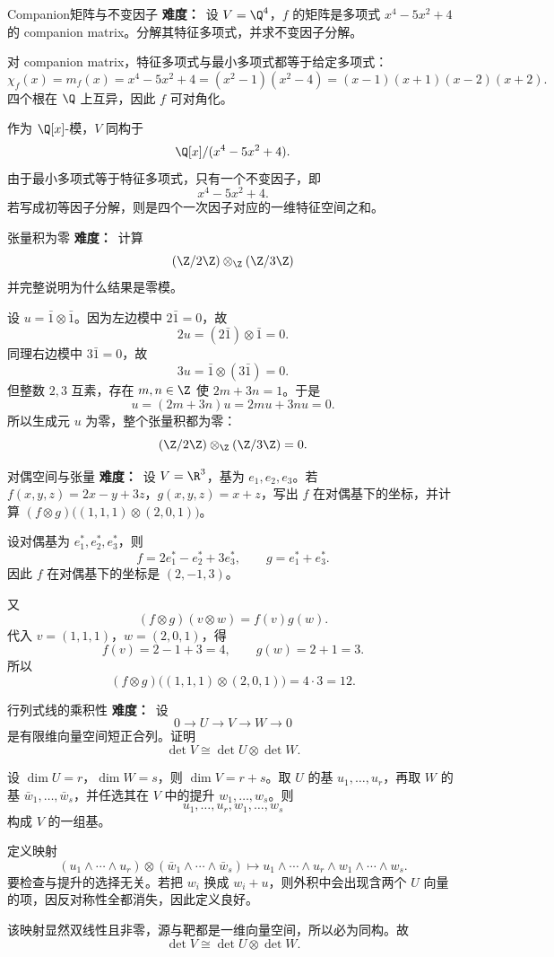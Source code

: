 \begin{problem}{Companion矩阵与不变因子}
\textbf{难度：}\medium\ 设 $V=\Q^4$，$f$ 的矩阵是多项式 $x^4-5x^2+4$ 的 companion matrix。分解其特征多项式，并求不变因子分解。
\end{problem}
\begin{solution}
对 companion matrix，特征多项式与最小多项式都等于给定多项式：
\[
\chi_f(x)=m_f(x)=x^4-5x^2+4=(x^2-1)(x^2-4)=(x-1)(x+1)(x-2)(x+2).
\]
四个根在 $\Q$ 上互异，因此 $f$ 可对角化。

作为 $\Q[x]$-模，$V$ 同构于
\[
\Q[x]/(x^4-5x^2+4).
\]
由于最小多项式等于特征多项式，只有一个不变因子，即
\[
x^4-5x^2+4.
\]
若写成初等因子分解，则是四个一次因子对应的一维特征空间之和。
\end{solution}

\begin{problem}{张量积为零}
\textbf{难度：}\medium\ 计算
\[
(\Z/2\Z)\otimes_\Z(\Z/3\Z)
\]
并完整说明为什么结果是零模。
\end{problem}
\begin{solution}
设 $u=\bar1\otimes\bar1$。因为左边模中 $2\bar1=0$，故
\[
2u=(2\bar1)\otimes\bar1=0.
\]
同理右边模中 $3\bar1=0$，故
\[
3u=\bar1\otimes(3\bar1)=0.
\]
但整数 $2,3$ 互素，存在 $m,n\in\Z$ 使 $2m+3n=1$。于是
\[
u=(2m+3n)u=2mu+3nu=0.
\]
所以生成元 $u$ 为零，整个张量积都为零：
\[
(\Z/2\Z)\otimes_\Z(\Z/3\Z)=0.
\]
\end{solution}

\begin{problem}{对偶空间与张量}
\textbf{难度：}\medium\ 设 $V=\R^3$，基为 $e_1,e_2,e_3$。若 $f(x,y,z)=2x-y+3z$，$g(x,y,z)=x+z$，写出 $f$ 在对偶基下的坐标，并计算 $(f\otimes g)\bigl((1,1,1)\otimes(2,0,1)\bigr)$。
\end{problem}
\begin{solution}
设对偶基为 $e_1^*,e_2^*,e_3^*$，则
\[
f=2e_1^*-e_2^*+3e_3^*,
\qquad
g=e_1^*+e_3^*.
\]
因此 $f$ 在对偶基下的坐标是 $(2,-1,3)$。

又
\[
(f\otimes g)(v\otimes w)=f(v)g(w).
\]
代入 $v=(1,1,1)$，$w=(2,0,1)$，得
\[
f(v)=2-1+3=4,
\qquad
g(w)=2+1=3.
\]
所以
\[
(f\otimes g)\bigl((1,1,1)\otimes(2,0,1)\bigr)=4\cdot3=12.
\]
\end{solution}

\begin{problem}{行列式线的乘积性}
\textbf{难度：}\hard\ 设
\[
0\to U\to V\to W\to0
\]
是有限维向量空间短正合列。证明
\[
\det V\cong \det U\otimes \det W.
\]
\end{problem}
\begin{solution}
设 $\dim U=r$，$\dim W=s$，则 $\dim V=r+s$。取 $U$ 的基 $u_1,\dots,u_r$，再取 $W$ 的基 $\bar w_1,\dots,\bar w_s$，并任选其在 $V$ 中的提升 $w_1,\dots,w_s$。则
\[
u_1,\dots,u_r,w_1,\dots,w_s
\]
构成 $V$ 的一组基。

定义映射
\[
(u_1\wedge\cdots\wedge u_r)\otimes(\bar w_1\wedge\cdots\wedge \bar w_s)
\longmapsto
u_1\wedge\cdots\wedge u_r\wedge w_1\wedge\cdots\wedge w_s.
\]
要检查与提升的选择无关。若把 $w_i$ 换成 $w_i+u$，则外积中会出现含两个 $U$ 向量的项，因反对称性全都消失，因此定义良好。

该映射显然双线性且非零，源与靶都是一维向量空间，所以必为同构。故
\[
\det V\cong \det U\otimes\det W.
\]
\end{solution}

